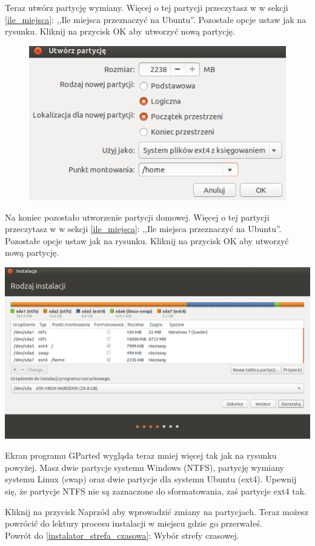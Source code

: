 Teraz utwórz partycję wymiany. Więcej o tej partycji przeczytasz w w sekcji \ref{ile_miejsca}: ,,Ile miejsca przeznaczyć na Ubuntu''. Pozostałe opcje ustaw jak na rysunku. Kliknij na przycisk \textcolor{ubuntu_orange}{OK} aby utworzyć nową partycję.
\begin{figure}
                \includegraphics[width=\linewidth]{images/instalator_partycjonowanie_gparted_dodaj_home.png}
\end{figure}
Na koniec pozostało utworzenie partycji domowej. Więcej o tej partycji przeczytasz w w sekcji \ref{ile_miejsca}: ,,Ile miejsca przeznaczyć na Ubuntu''. Pozostałe opcje ustaw jak na rysunku. Kliknij na przycisk \textcolor{ubuntu_orange}{OK} aby utworzyć nową partycję.
\clearpage
\begin{center}
        \includegraphics[width=\linewidth]{images/instalator_partycjonowanie_gparted4.png}
\end{center}
Ekran programu GParted wygląda teraz mniej więcej tak jak na rysunku powyżej. Masz dwie partycje systemu Windows (NTFS), partycję wymiany systemu Linux (swap) oraz dwie partycje dla systemu Ubuntu (ext4). Upewnij się, że partycje NTFS \textcolor{ubuntu_orange}{nie} są zaznaczone do sformatowania, zaś partycje ext4 tak.

Kliknij na przycisk \textcolor{ubuntu_orange}{Naprzód} aby wprowadzić zmiany na partycjach. Teraz możesz powrócić do lektury procesu instalacji w miejscu gdzie go przerwałeś.\\
Powrót do \ref{instalator_strefa_czasowa}: Wybór strefy czasowej.
\clearpage
